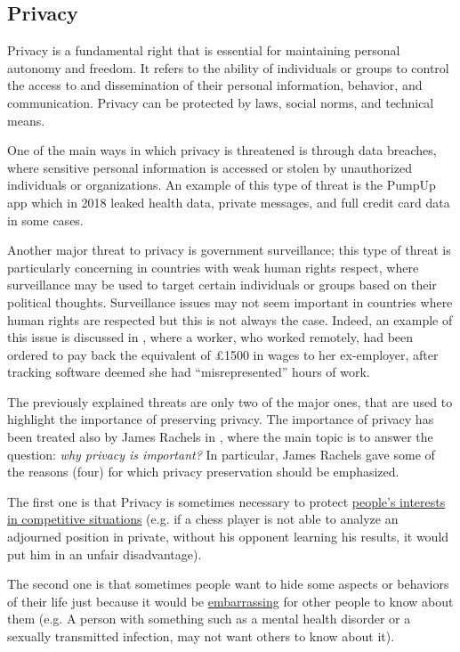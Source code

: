 \documentclass{article}
\begin{document}
\subsection{Privacy}
Privacy is a fundamental right that is essential for maintaining personal autonomy and freedom. It refers to the ability of individuals or groups to control the access to and dissemination of their personal information, behavior, and communication.\cite{van_den_hoven_privacy_2020} Privacy can be protected by laws, social norms, and technical means.

One of the main ways in which privacy is threatened is through data breaches, where sensitive personal information is accessed or stolen by unauthorized individuals or organizations. An example of this type of threat is the PumpUp app which in 2018 leaked health data, private messages, and full credit card data in some cases.\cite{noauthor_popular_nodate}

Another major threat to privacy is government surveillance; this type of threat is particularly concerning in countries with weak human rights respect, where surveillance may be used to target certain individuals or groups based on their political thoughts. Surveillance issues may not seem important in countries where human rights are respected but this is not always the case. Indeed, an example of this issue is discussed in \cite{noauthor_ethical_nodate}, where a worker, who worked remotely, had been ordered to pay back the equivalent of £1500 in wages to her ex-employer, after tracking software deemed she had “misrepresented” hours of work.

The previously explained threats are only two of the major ones, that are used to highlight the importance of preserving privacy. The importance of privacy has been treated also by James Rachels in \cite{rachels_why_1975}, where the main topic is to answer the question: \textit{why privacy is important?} In particular, James Rachels gave some of the reasons (four) for which privacy preservation should be emphasized. 

The first one is that Privacy is sometimes necessary to protect \ul{people's interests in competitive situations} (e.g. if a chess player is not able to analyze an adjourned position in private, without his opponent learning his results, it would put him in an unfair disadvantage).

The second one is that sometimes people want to hide some aspects or behaviors of their life just because it would be \ul{embarrassing} for other people to know about them (e.g. A person with something such as a mental health disorder or a sexually transmitted infection, may not want others to know about it).
\end{document}
